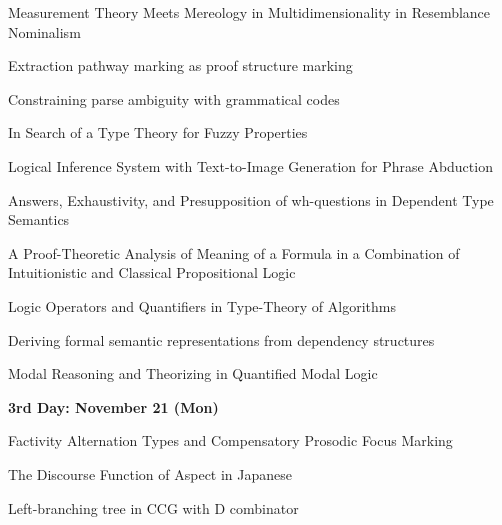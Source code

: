 \documentclass[12pt]{jarticle}
\begin{document}
  
      {Measurement Theory Meets Mereology in Multidimensionality in Resemblance Nominalism}
      {}
  
      {Extraction pathway marking as proof structure marking}
      {}
  
      {Constraining parse ambiguity with grammatical codes}
      {}




  
      {In Search of a Type Theory for Fuzzy Properties}
      {}
  
      {Logical Inference System with Text-to-Image Generation for Phrase Abduction}
      {}
  
      {Answers, Exhaustivity, and Presupposition of wh-questions in Dependent Type Semantics}
      {}




  
      {A Proof-Theoretic Analysis of Meaning of a Formula in a Combination of Intuitionistic and Classical Propositional Logic}
      {}
  
      {Logic Operators and Quantifiers in Type-Theory of Algorithms}
      {}
  
      {Deriving formal semantic representations from dependency structures}
      {}




  
      {Modal Reasoning and Theorizing in Quantified Modal Logic}
      {}




\noindent\textbf{\large 
3rd Day: November 21 (Mon)
}\\




  
      {Factivity Alternation Types and Compensatory Prosodic Focus Marking}
      {}
  
      {The Discourse Function of Aspect in Japanese}
      {}
  
      {Left-branching tree in CCG with D combinator}
      {}
\end{document}
